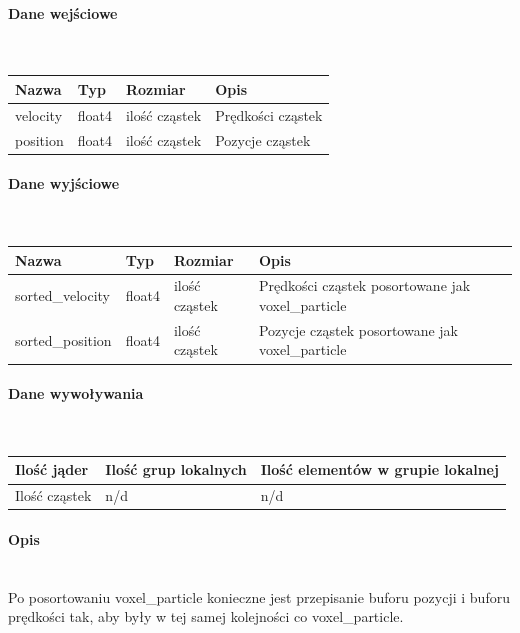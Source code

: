 \documentclass[polish, 12pt]{aghthesis}
\begin{document}
				\paragraph{Dane wejściowe} \ \\
					\begin{tabular}{| p{} | p{} | p{} | p{} |}
					\hline
						Nazwa & Typ & Rozmiar & Opis \\
					\hline
						velocity & float4 & ilość cząstek & Prędkości cząstek \\
					\hline
						position & float4 & ilość cząstek & Pozycje cząstek \\
					\hline
					\end{tabular}
				\paragraph{Dane wyjściowe} \ \\
					\begin{tabular}{| p{} | p{} | p{} | p{} |}
					\hline
						Nazwa & Typ & Rozmiar & Opis \\
					\hline
						sorted\_velocity & float4 & ilość cząstek & Prędkości cząstek posortowane jak voxel\_particle\\
					\hline
						sorted\_position & float4 & ilość cząstek & Pozycje cząstek posortowane jak voxel\_particle\\
					\hline
					\end{tabular}
				\paragraph{Dane wywoływania} \ \\
					\begin{tabular}{| p{} | p{} | p{}|}
					\hline
						Ilość jąder & Ilość grup lokalnych & Ilość elementów w grupie lokalnej \\
					\hline
						Ilość cząstek & n/d & n/d \\ 
					\hline
					\end{tabular}
				\paragraph{Opis} \ \\
					\indent Po posortowaniu voxel\_particle konieczne jest przepisanie buforu pozycji i buforu prędkości tak, aby były w tej samej kolejności co voxel\_particle.
\end{document}
